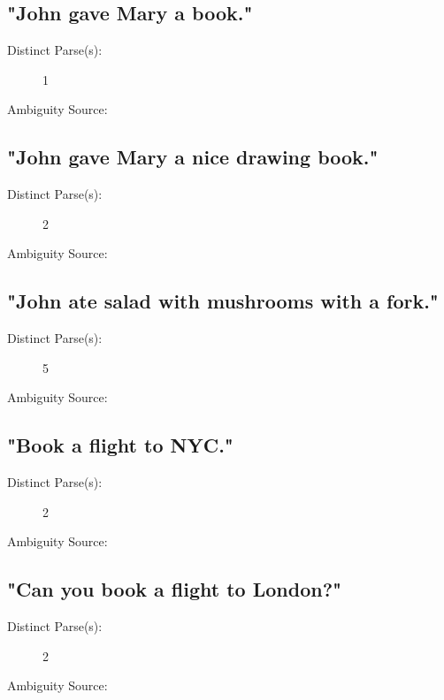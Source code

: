 \documentclass{article}
\begin{document}
\subsection{"John gave Mary a book."}

\begin{description}
	\item[Distinct Parse(s):]
	1
	\item[Ambiguity Source:]
	
\end{description} 

\subsection{"John gave Mary a nice drawing book."}

\begin{description}
	\item[Distinct Parse(s):]
	2
	\item[Ambiguity Source:]
	
\end{description} 

\subsection{"John ate salad with mushrooms with a fork."}

\begin{description}
	\item[Distinct Parse(s):]
	5
	\item[Ambiguity Source:]
	
\end{description}

\subsection{"Book a flight to NYC."}

\begin{description}
	\item[Distinct Parse(s):]
	2
	\item[Ambiguity Source:]
	
\end{description}

\subsection{"Can you book a flight to London?"}

\begin{description}
	\item[Distinct Parse(s):]
	2
	\item[Ambiguity Source:]
	
\end{description}
\end{document}
